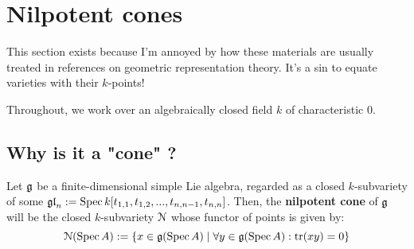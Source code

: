     \section{Nilpotent cones}
        This section exists because I'm annoyed by how these materials are usually treated in references on geometric representation theory. It's a sin to equate varieties with their $k$-points!
    
        \begin{convention}
            Throughout, we work over an algebraically closed field $k$ of characteristic $0$.
        \end{convention}
    
        \subsection{Why is it a "cone" ?}
            \begin{definition} \label{def: nilpotent_cones}
                Let $\mathfrak{g}$ be a finite-dimensional simple Lie algebra, regarded as a closed $k$-subvariety of some $\mathfrak{gl}_n := \operatorname{Spec} k[t_{1, 1}, t_{1, 2}, ..., t_{n, n - 1}, t_{n, n}]$. Then, the \textbf{nilpotent cone} of $\mathfrak{g}$ will be the closed $k$-subvariety $\mathcal{N}$ whose functor of points is given by:
                    $$\mathcal{N}(\operatorname{Spec} A) := \{ x \in \mathfrak{g}(\operatorname{Spec} A) \mid \forall y \in \mathfrak{g}(\operatorname{Spec} A): \operatorname{tr}(xy) = 0 \}$$
            \end{definition}
